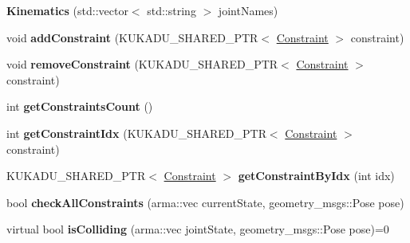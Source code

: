 \begin{DoxyCompactItemize}
\item 
{\bfseries Kinematics} (std\+::vector$<$ std\+::string $>$ joint\+Names)\hypertarget{classkukadu_1_1Kinematics_a13e20d58d587757cae1d9d3a2c34ac40}{}\label{classkukadu_1_1Kinematics_a13e20d58d587757cae1d9d3a2c34ac40}

\item 
void {\bfseries add\+Constraint} (K\+U\+K\+A\+D\+U\+\_\+\+S\+H\+A\+R\+E\+D\+\_\+\+P\+TR$<$ \hyperlink{classkukadu_1_1Constraint}{Constraint} $>$ constraint)\hypertarget{classkukadu_1_1Kinematics_a6148045661ff549e6f6627e4ef71e03c}{}\label{classkukadu_1_1Kinematics_a6148045661ff549e6f6627e4ef71e03c}

\item 
void {\bfseries remove\+Constraint} (K\+U\+K\+A\+D\+U\+\_\+\+S\+H\+A\+R\+E\+D\+\_\+\+P\+TR$<$ \hyperlink{classkukadu_1_1Constraint}{Constraint} $>$ constraint)\hypertarget{classkukadu_1_1Kinematics_a3c79131b3d003ed6a02079ff575c7f75}{}\label{classkukadu_1_1Kinematics_a3c79131b3d003ed6a02079ff575c7f75}

\item 
int {\bfseries get\+Constraints\+Count} ()\hypertarget{classkukadu_1_1Kinematics_a4eb2b717f47bf4d28a82bfded60f75b6}{}\label{classkukadu_1_1Kinematics_a4eb2b717f47bf4d28a82bfded60f75b6}

\item 
int {\bfseries get\+Constraint\+Idx} (K\+U\+K\+A\+D\+U\+\_\+\+S\+H\+A\+R\+E\+D\+\_\+\+P\+TR$<$ \hyperlink{classkukadu_1_1Constraint}{Constraint} $>$ constraint)\hypertarget{classkukadu_1_1Kinematics_af6a30efefca4b925d68173ed8af060f5}{}\label{classkukadu_1_1Kinematics_af6a30efefca4b925d68173ed8af060f5}

\item 
K\+U\+K\+A\+D\+U\+\_\+\+S\+H\+A\+R\+E\+D\+\_\+\+P\+TR$<$ \hyperlink{classkukadu_1_1Constraint}{Constraint} $>$ {\bfseries get\+Constraint\+By\+Idx} (int idx)\hypertarget{classkukadu_1_1Kinematics_a59ed85e60fb4d6b82bc5e145a55b1e56}{}\label{classkukadu_1_1Kinematics_a59ed85e60fb4d6b82bc5e145a55b1e56}

\item 
bool {\bfseries check\+All\+Constraints} (arma\+::vec current\+State, geometry\+\_\+msgs\+::\+Pose pose)\hypertarget{classkukadu_1_1Kinematics_a685f76d61feec05ba02fb8f82c30bc63}{}\label{classkukadu_1_1Kinematics_a685f76d61feec05ba02fb8f82c30bc63}

\item 
virtual bool {\bfseries is\+Colliding} (arma\+::vec joint\+State, geometry\+\_\+msgs\+::\+Pose pose)=0\hypertarget{classkukadu_1_1Kinematics_a050de3ff89fdec3b1debfeddf34ffa44}{}\label{classkukadu_1_1Kinematics_a050de3ff89fdec3b1debfeddf34ffa44}


\end{DoxyCompactItemize}
